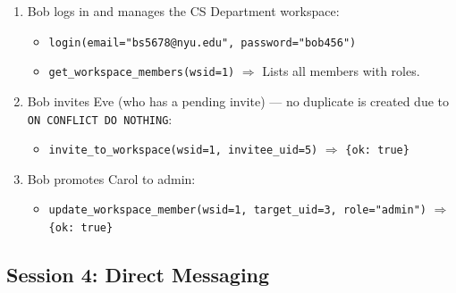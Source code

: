 \documentclass[11pt]{article}
\begin{document}
\begin{enumerate}
    \item Bob logs in and manages the CS Department workspace:
    \begin{itemize}
        \item \texttt{login(email="bs5678@nyu.edu", password="bob456")}
        \item \texttt{get\_workspace\_members(wsid=1)} $\Rightarrow$ Lists all members with roles.
    \end{itemize}

    \item Bob invites Eve (who has a pending invite) --- no duplicate is created due to \texttt{ON CONFLICT DO NOTHING}:
    \begin{itemize}
        \item \texttt{invite\_to\_workspace(wsid=1, invitee\_uid=5)} $\Rightarrow$ \texttt{\{ok: true\}}
    \end{itemize}

    \item Bob promotes Carol to admin:
    \begin{itemize}
        \item \texttt{update\_workspace\_member(wsid=1, target\_uid=3, role="admin")} $\Rightarrow$ \texttt{\{ok: true\}}
    \end{itemize}
\end{enumerate}

\subsection{Session 4: Direct Messaging}
\end{document}
